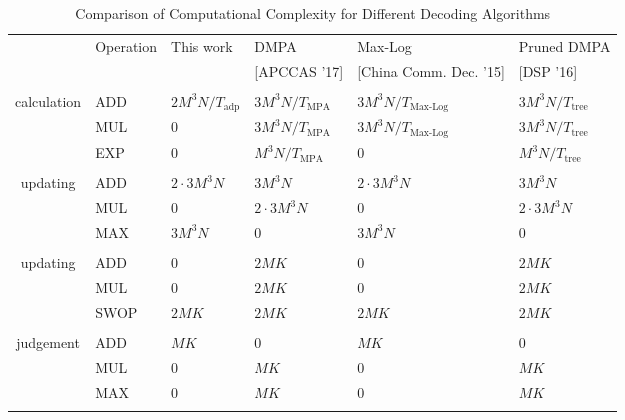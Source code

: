\documentclass[journal,twoside]{IEEEtran}
\begin{document}
\begin{table*}[htbp]
\centering
\renewcommand\arraystretch{1.2}
\footnotesize
\caption{\label{tab:complexity}Comparison of Computational Complexity for Different Decoding Algorithms}
\begin{tabular}{clllll}
\Xhline{1.0pt}
  \multirow{2}{*}{Procedure} & \multirow{2}{*}{Operation} & \multirow{2}{*}{This work} & DMPA \cite{SCMA_archi} & Max-Log \cite{Max-log} & Pruned DMPA \cite{tree_2} \\
  & & & [APCCAS '17] & [China Comm. Dec. '15] & [DSP '16]\\
  \Xhline{.5pt}
\multirow{3}{*}{\minitab[c]{Initial probability \\ calculation}} & \cellcolor{gray!15}ADD & \cellcolor{gray!15}$2M^{3}N/T_{\text{adp}}$ & \cellcolor{gray!15}$3M^{3}N/T_{\text{MPA}}$ & \cellcolor{gray!15}$3M^{3}N/T_{\text{Max-Log}}$ & \cellcolor{gray!15}$3M^{3}N/T_{\text{tree}}$ \\
& MUL & $0$ & $3M^{3}N/T_{\text{MPA}}$ & $3M^{3}N/T_{\text{Max-Log}}$ & $3M^{3}N/T_{\text{tree}}$ \\
& \cellcolor{gray!15}EXP & \cellcolor{gray!15}$0$ & \cellcolor{gray!15}$M^{3}N/T_{\text{MPA}}$ & \cellcolor{gray!15}0 & \cellcolor{gray!15}$M^{3}N/T_{\text{tree}}$ \\ \Xhline{.5pt}
\multirow{3}{*}{\minitab[c]{Resource node \\ updating}} & ADD & $2 \cdot 3M^{3}N$ & $3M^{3}N$ & $2 \cdot 3M^{3}N$ & $3M^{3}N$ \\
& \cellcolor{gray!15}MUL & \cellcolor{gray!15}$0$ & \cellcolor{gray!15}$2 \cdot 3M^{3}N$ & \cellcolor{gray!15}0 & \cellcolor{gray!15}$2 \cdot 3M^{3}N$ \\
& MAX & $3M^{3}N$ & 0 & $3M^{3}N$ & 0\\ \Xhline{.5pt}
\multirow{3}{*}{\minitab[c]{Layer node \\ updating}} & \cellcolor{gray!15}ADD & \cellcolor{gray!15}0 & \cellcolor{gray!15}$2MK$ & \cellcolor{gray!15}0 & \cellcolor{gray!15}$2MK$\\
& MUL & 0 & $2MK$ & 0 & $2MK$ \\
& \cellcolor{gray!15}SWOP & \cellcolor{gray!15}$2MK$ & \cellcolor{gray!15}$2MK$ & \cellcolor{gray!15}$2MK$ & \cellcolor{gray!15}$2MK$ \\ \Xhline{.5pt}
\multirow{3}{*}{\minitab[c]{Users' symbol \\ judgement}} & ADD & $MK$ & 0 & $MK$ & 0 \\
& \cellcolor{gray!15}MUL & \cellcolor{gray!15}0 & \cellcolor{gray!15}$MK$ & \cellcolor{gray!15}0 & \cellcolor{gray!15}$MK$ \\
& MAX & 0 & $MK$ & 0 & $MK$ \\
\Xhline{1.0pt}
\end{tabular}
\end{table*}
\end{document}

